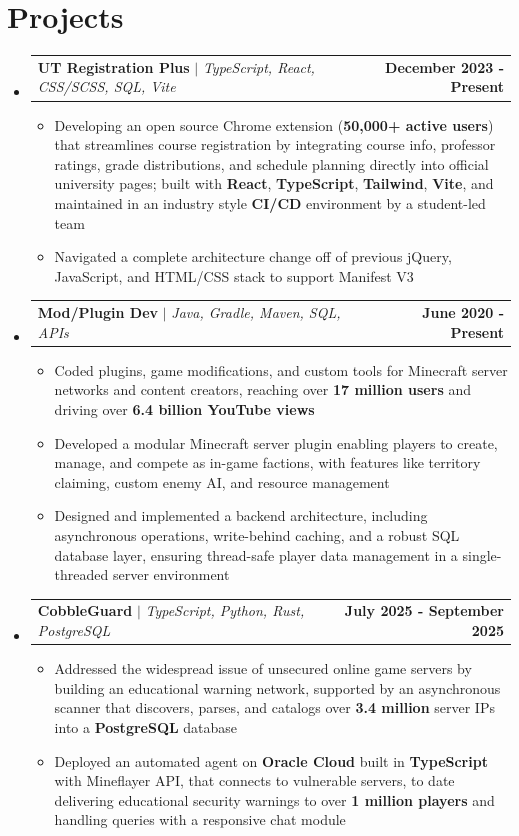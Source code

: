 \documentclass[letterpaper,11pt]{article}
\makeatletter
\newcommand{\resumeItem}[1]{
  \item\small{
    {#1 \vspace{-2pt}}
  }
}
\newcommand{\resumeProjectHeading}[2]{
    \item
    \begin{tabular*}{1.001\textwidth}{l@{\extracolsep{\fill}}r}
      \small#1 & \textbf{\small #2}\\
    \end{tabular*}\vspace{-7pt}
}
\newcommand{\resumeSubHeadingListStart}{\begin{itemize}[leftmargin=0.0in, label={}]}
\newcommand{\resumeSubHeadingListEnd}{\end{itemize}}
\newcommand{\resumeItemListStart}{\begin{itemize}}
\newcommand{\resumeItemListEnd}{\end{itemize}\vspace{-5pt}}
\makeatother
\begin{document}
{\section{Projects}
\vspace{-5pt}
\resumeSubHeadingListStart
\resumeProjectHeading
{\textbf{UT Registration Plus} $|$ \emph{TypeScript, React, CSS/SCSS, SQL, Vite}}{December 2023 - Present}
\resumeItemListStart
\resumeItem{Developing an open source Chrome extension (\textbf{50,000+ active users}) that streamlines course registration by integrating course info, professor ratings, grade distributions, and schedule planning directly into official university pages; built with \textbf{React}, \textbf{TypeScript}, \textbf{Tailwind}, \textbf{Vite}, and maintained in an industry style \textbf{CI/CD} environment by a student-led team}
\resumeItem{Navigated a complete architecture change off of previous jQuery, JavaScript, and HTML/CSS stack to support Manifest V3}
\resumeItemListEnd
\vspace{-13pt}
\resumeProjectHeading
{\textbf{Mod/Plugin Dev} $|$ \emph{Java, Gradle, Maven, SQL, APIs}}{June 2020 - Present}
\resumeItemListStart
\resumeItem{Coded plugins, game modifications, and custom tools for Minecraft server networks and content creators, reaching over \textbf{17 million users} and driving over \textbf{6.4 billion YouTube views}}
\resumeItem{Developed a modular Minecraft server plugin enabling players to create, manage, and compete as in-game factions, with features like territory claiming, custom enemy AI, and resource management}
\resumeItem{Designed and implemented a backend architecture, including asynchronous operations, write-behind caching, and a robust SQL database layer, ensuring thread-safe player data management in a single-threaded server environment}
\resumeItemListEnd 
\vspace{-13pt}
\resumeProjectHeading
{\textbf{CobbleGuard} $|$ \emph{TypeScript, Python, Rust, PostgreSQL}}{July 2025 - September 2025}
\resumeItemListStart
\resumeItem{Addressed the widespread issue of unsecured online game servers by building an educational warning network, supported by an asynchronous scanner that discovers, parses, and catalogs over \textbf{3.4 million} server IPs into a \textbf{PostgreSQL} database}
\resumeItem{Deployed an automated agent on \textbf{Oracle Cloud} built in \textbf{TypeScript} with Mineflayer API, that connects to vulnerable servers, to date delivering educational security warnings to over \textbf{1 million players} and handling queries with a responsive chat module} 
\resumeItemListEnd
\resumeSubHeadingListEnd


}
\end{document}
